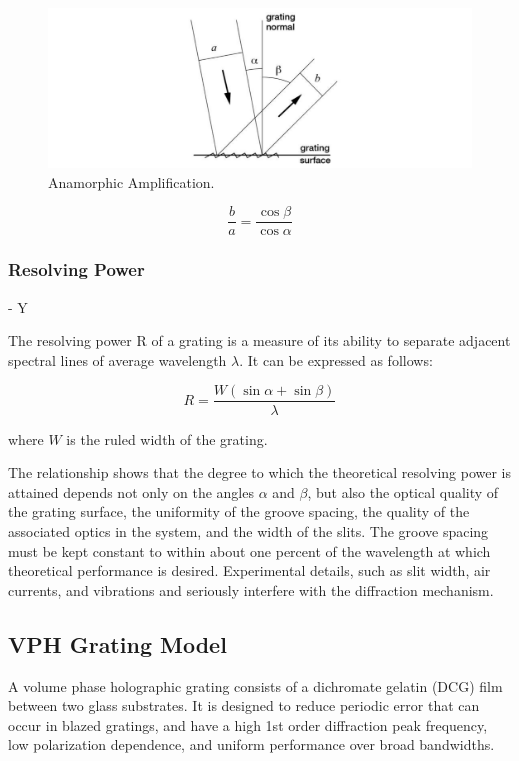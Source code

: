 \begin{figure}[H]
\centering
\includegraphics[width=\textwidth]{figures/anamorphic-amplification.png}
\caption{Anamorphic Amplification.}
\label{fig:anamorphic-amplification}
\end{figure}

\begin{equation}
\frac{b}{a} = \frac{\cos\beta}{\cos\alpha}
\end{equation}

\subsubsection{Resolving Power} - Y

The resolving power R of a grating is a measure of its ability to separate adjacent spectral lines of average wavelength $\lambda$. It can be expressed as follows:

\begin{equation}
R = \frac{W(\sin\alpha + \sin\beta)}{\lambda}
\end{equation}

where $W$ is the ruled width of the grating.

The relationship shows that the degree to which the theoretical resolving power is attained depends not only on the angles $\alpha$ and $\beta$, but also the optical quality of the grating surface, the uniformity of the groove spacing, the quality of the associated optics in the system, and the width of the slits. The groove spacing must be kept constant to within about one percent of the wavelength at which theoretical performance is desired. Experimental details, such as slit width, air currents, and vibrations and seriously interfere with the diffraction mechanism. 

\subsection{VPH Grating Model} 
A volume phase holographic grating consists of a dichromate gelatin (DCG) film between two glass substrates. It is designed to reduce periodic error that can occur in blazed gratings, and have a high 1st order diffraction peak frequency, low polarization dependence, and uniform performance over broad bandwidths. 

